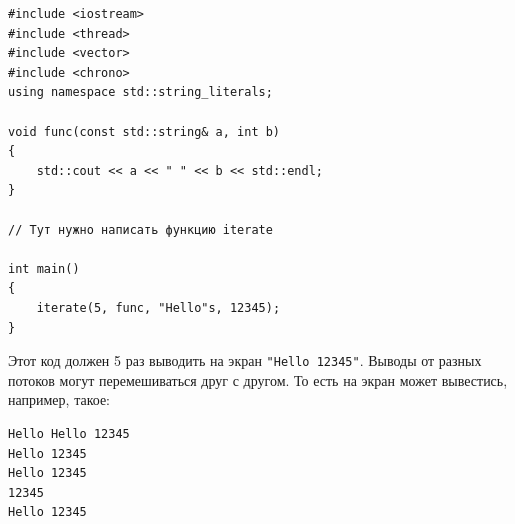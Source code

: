 \documentclass{article}
\begin{document}
\begin{lstlisting}
#include <iostream>
#include <thread>
#include <vector>
#include <chrono>
using namespace std::string_literals;

void func(const std::string& a, int b)
{
    std::cout << a << " " << b << std::endl;
}

// Тут нужно написать функцию iterate

int main()
{
    iterate(5, func, "Hello"s, 12345);
}
\end{lstlisting}
Этот код должен 5 раз выводить на экран \texttt{"Hello 12345"}. Выводы от разных потоков могут перемешиваться друг с другом. То есть на экран может вывестись, например, такое:
\begin{verbatim}
Hello Hello 12345
Hello 12345
Hello 12345
12345
Hello 12345
\end{verbatim}
\end{document}
